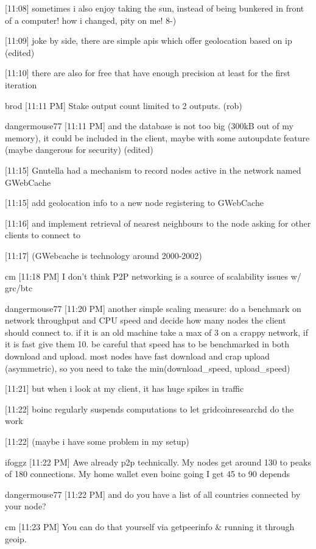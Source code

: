 {[11:08] 
sometimes i also enjoy taking the sun, instead of being bunkered in front of a computer! how i changed, pity on me! 8-)


[11:09] 
joke by side, there are simple apis which offer geolocation based on ip (edited)


[11:10] 
there are also for free that have enough precision at least for the first iteration


brod 
[11:11 PM] 
Stake output count limited to 2 outputs. (rob)


dangermouse77 [11:11 PM] 
and the database is not too big (300kB out of my memory), it could be included in the client, maybe with some autoupdate feature (maybe dangerous for security) (edited)


[11:15] 
Gnutella had a mechanism to record nodes active in the network named GWebCache


[11:15] 
add geolocation info to a new node registering to GWebCache


[11:16] 
and implement retrieval of nearest neighbours to the node asking for other clients to connect to


[11:17] 
(GWebcache is technology around 2000-2002)


cm 
[11:18 PM] 
I don't think P2P networking is a source of scalability issues w/ grc/btc


dangermouse77 [11:20 PM] 
another simple scaling measure: do a benchmark on network throughput and CPU speed and decide how many nodes the client should connect to. if it is an old machine take a max of 3 on a crappy network, if it is fast give them 10. be careful that speed has to be benchmarked in both download and upload. most nodes have fast download and crap upload (asymmetric), so you need to take the min(download_speed, upload_speed)


[11:21] 
but when i look at my client, it has huge spikes in traffic


[11:22] 
boinc regularly suspends computations to let gridcoinresearchd do the work


[11:22] 
(maybe i have some problem in my setup)


ifoggz
[11:22 PM] 
Awe already p2p technically. My nodes get around 130 to peaks of 180 connections. My home wallet even boinc going I get 45 to 90 depends


dangermouse77 [11:22 PM] 
and do you have a list of all countries connected by your node?


cm 
[11:23 PM] 
You can do that yourself via getpeerinfo & running it through geoip.


}
